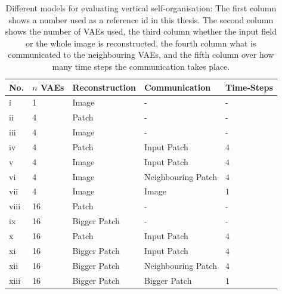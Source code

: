 \begin{table}[h] 
    \centering
	 \begin{tabular}{l l l l l}
    	\textbf{No.} & \textbf{$n$ VAEs} & \textbf{Reconstruction} & \textbf{Communication} & \textbf{Time-Steps}\\
        \hline
		i & 1 & Image & -  & -\\
		ii & 4 & Patch & -  & -\\
		iii & 4 & Image & - & -\\
		iv & 4 & Patch & Input Patch & $4$\\ %
		v & 4 & Image & Input Patch & $4$\\  %
		vi & 4 & Image & Neighbouring Patch & $4$\\ %
		vii & 4 & Image & Image & $1$\\
		viii & 16 & Patch & -  & -\\
		ix & 16 & Bigger Patch & - & -\\
		x & 16 & Patch & Input Patch & $4$\\ %
		xi & 16 & Bigger Patch & Input Patch & $4$\\  %
		xii & 16 & Bigger Patch & Neighbouring Patch & $4$\\ %
		xiii & 16 & Bigger Patch & Bigger Patch & $1$\\		
		
    \end{tabular}
    \caption[Different models to evaluate vertical self-organisation]{Different models for evaluating vertical self-organisation: The first column shows a number used as a reference id in this thesis. The second column shows the number of VAEs used, the third column whether the input field or the whole image is reconstructed, the fourth column what is communicated to the neighbouring VAEs, and the fifth column over how many time steps the communication takes place.}
\end{table}


